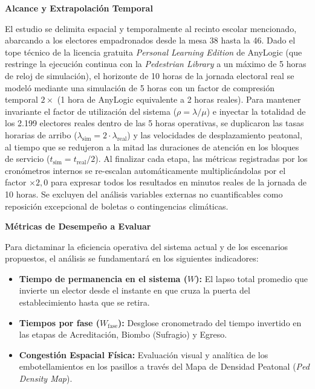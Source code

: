 \documentclass[11pt,a4paper]{article}
\begin{document}
\vspace{0.5cm}
\noindent \textbf{Alcance y Extrapolación Temporal}

El estudio se delimita espacial y temporalmente al recinto escolar mencionado, abarcando a los electores empadronados desde la mesa 38 hasta la 46. Dado el tope técnico de la licencia gratuita \textit{Personal Learning Edition} de AnyLogic (que restringe la ejecución continua con la \textit{Pedestrian Library} a un máximo de 5 horas de reloj de simulación), el horizonte de 10 horas de la jornada electoral real se modeló mediante una simulación de 5 horas con un factor de compresión temporal $2\times$ (1 hora de AnyLogic equivalente a 2 horas reales). Para mantener invariante el factor de utilización del sistema ($\rho = \lambda / \mu$) e inyectar la totalidad de los 2.199 electores reales dentro de las 5 horas operativas, se duplicaron las tasas horarias de arribo ($\lambda_{\text{sim}} = 2 \cdot \lambda_{\text{real}}$) y las velocidades de desplazamiento peatonal, al tiempo que se redujeron a la mitad las duraciones de atención en los bloques de servicio ($t_{\text{sim}} = t_{\text{real}} / 2$). Al finalizar cada etapa, las métricas registradas por los cronómetros internos se re-escalan automáticamente multiplicándolas por el factor $\times 2{,}0$ para expresar todos los resultados en minutos reales de la jornada de 10 horas. Se excluyen del análisis variables externas no cuantificables como reposición excepcional de boletas o contingencias climáticas.

\vspace{0.5cm}
\noindent \textbf{Métricas de Desempeño a Evaluar}

Para dictaminar la eficiencia operativa del sistema actual y de los escenarios propuestos, el análisis se fundamentará en los siguientes indicadores:
\begin{itemize}
    \item \textbf{Tiempo de permanencia en el sistema ($W$):} El lapso total promedio que invierte un elector desde el instante en que cruza la puerta del establecimiento hasta que se retira.
    \item \textbf{Tiempos por fase ($W_{\text{fase}}$):} Desglose cronometrado del tiempo invertido en las etapas de Acreditación, Biombo (Sufragio) y Egreso.
    \item \textbf{Congestión Espacial Física:} Evaluación visual y analítica de los embotellamientos en los pasillos a través del Mapa de Densidad Peatonal (\textit{Ped Density Map}).
\end{itemize}
\end{document}
